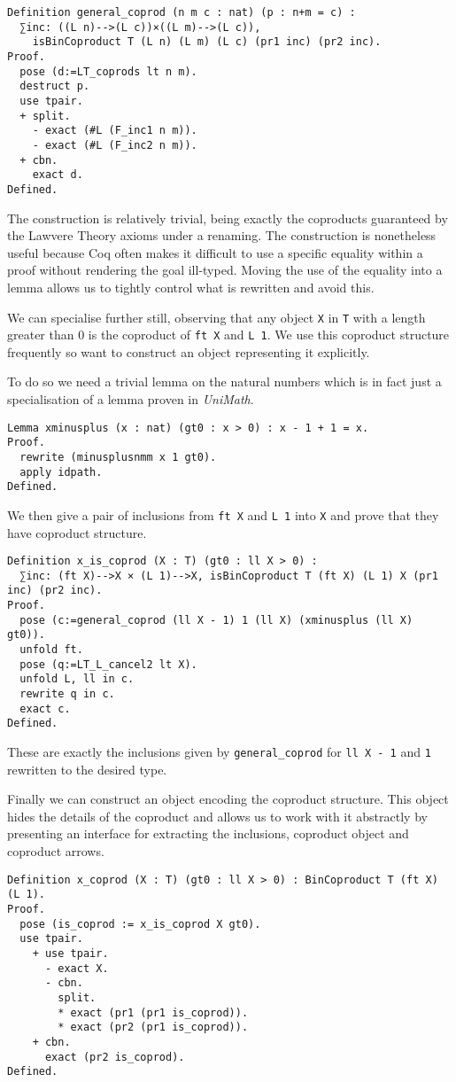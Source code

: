 \begin{lstlisting}
Definition general_coprod (n m c : nat) (p : n+m = c) : 
  ∑inc: ((L n)-->(L c))×((L m)-->(L c)),
    isBinCoproduct T (L n) (L m) (L c) (pr1 inc) (pr2 inc).
Proof.
  pose (d:=LT_coprods lt n m).
  destruct p.
  use tpair.
  + split.
    - exact (#L (F_inc1 n m)).
    - exact (#L (F_inc2 n m)).
  + cbn.
    exact d.
Defined.
\end{lstlisting}

The construction is relatively trivial, being exactly the coproducts guaranteed
by the Lawvere Theory axioms under a renaming. The construction is nonetheless
useful because Coq often makes it difficult to use a specific equality within a
proof without rendering the goal ill-typed. Moving the use of the equality into
a lemma allows us to tightly control what is rewritten and avoid this.

We can specialise further still, observing that any object \lstinline|X| in
\lstinline|T| with a length greater than 0 is the coproduct of \lstinline|ft X|
and \lstinline|L 1|. We use this coproduct structure frequently so want to
construct an object representing it explicitly.

To do so we need a trivial lemma on the natural numbers which is in fact just a
specialisation of a lemma proven in \textit{UniMath}.

\begin{lstlisting}
Lemma xminusplus (x : nat) (gt0 : x > 0) : x - 1 + 1 = x.
Proof.
  rewrite (minusplusnmm x 1 gt0).
  apply idpath.
Defined.
\end{lstlisting}

We then give a pair of inclusions from \lstinline|ft X| and \lstinline|L 1| into \lstinline|X|
and prove that they have coproduct structure. 
\begin{lstlisting}
Definition x_is_coprod (X : T) (gt0 : ll X > 0) : 
  ∑inc: (ft X)-->X × (L 1)-->X, isBinCoproduct T (ft X) (L 1) X (pr1 inc) (pr2 inc).
Proof.
  pose (c:=general_coprod (ll X - 1) 1 (ll X) (xminusplus (ll X) gt0)).
  unfold ft.
  pose (q:=LT_L_cancel2 lt X).
  unfold L, ll in c.
  rewrite q in c.
  exact c.
Defined.
\end{lstlisting}

These are exactly the inclusions given by \lstinline|general_coprod| for 
\lstinline|ll X - 1| and \lstinline|1| rewritten to the desired type.

Finally we can construct an object encoding the coproduct structure. This object
hides the details of the coproduct and allows us to work with it abstractly by
presenting an interface for extracting the inclusions, coproduct object and
coproduct arrows.
\begin{lstlisting}
Definition x_coprod (X : T) (gt0 : ll X > 0) : BinCoproduct T (ft X) (L 1).
Proof.
  pose (is_coprod := x_is_coprod X gt0).
  use tpair.
    + use tpair.
      - exact X.
      - cbn.
        split.
        * exact (pr1 (pr1 is_coprod)).
        * exact (pr2 (pr1 is_coprod)).
    + cbn.
      exact (pr2 is_coprod).
Defined.
\end{lstlisting}

